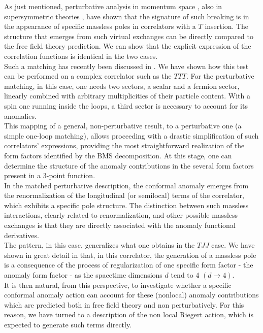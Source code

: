 \documentclass[a4paper,11pt,openright,twoside]{book}
\numberwithin{equation}{section}
\begin{document}
As just mentioned, perturbative analysis in momentum space \cite{Giannotti:2008cv,Armillis:2009pq,Armillis:2009im}, also in supersymmetric theories \cite{Coriano:2014gja}, have shown that the signature of such breaking is in the appearance of specific massless poles in correlators with a $T$ insertion. The structure that emerges from such virtual exchanges can be directly compared to the free field theory prediction. We can show that the explicit expression of the correlation functions is identical in the two cases. \\
Such a matching has recently been discussed in  \cite{Coriano:2018bsy,Coriano:2018bbe,Coriano:2018zdo}. We have shown how this test can be performed on a complex correlator such as the $TTT$. For the perturbative matching, in this case, one needs two sectors, a scalar and a fermion sector, linearly combined with arbitrary multiplicities of their particle content.  With a spin one running inside the loops, a third sector is necessary to account for its anomalies. \\  
This mapping of a general, non-perturbative result, to a perturbative one (a simple one-loop matching), allows proceeding with a drastic simplification of such correlators' expressions, providing the most straightforward realization of the form factors identified by the BMS decomposition. At this stage, one can determine the structure of the anomaly contributions in the several form factors present in a 3-point function.  \\
In the matched perturbative description, the conformal anomaly emerges from the renormalization of the longitudinal (or semilocal) terms of the correlator, which exhibits a specific pole structure. 
The distinction between such massless interactions, clearly related to renormalization, and other possible massless exchanges is that they are directly associated with the anomaly functional derivatives. \\
The pattern, in this case, generalizes what one obtains in the $TJJ$ case. 
We have shown in great detail in \cite{Coriano:2018zdo} that, in this correlator, the generation of a massless pole is a consequence of the process of regularization of one specific form factor - the anomaly form factor - as the spacetime dimensions $d$ tend to 4 $(d\to 4)$.    \\
It is then natural, from this perspective, to investigate whether a specific conformal anomaly action can account for these (nonlocal) anomaly contributions which are predicted both in free field theory and non perturbatively. For this reason, we have turned to a description of the non local Riegert action, which is expected to generate such terms directly. \\
\end{document}
